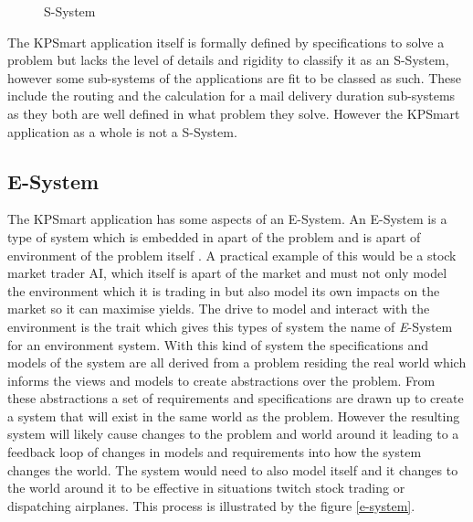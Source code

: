 \documentclass{style/CRPITStyle}
\renewcommand{\cite}{\citep}
\begin{document}
\vspace{.1in}

\begin{figure}[htb]
\caption{\protect\label{s-system} S-System}
\end{figure}

\vspace{.1in}

The KPSmart application itself is formally defined by specifications to solve a
problem but lacks the level of details and rigidity to classify it as an
S-System, however some sub-systems of the applications are fit to be classed as such.
These include the routing and the calculation for a mail delivery duration
sub-systems as they both are well defined in what problem they solve.
However the KPSmart application as a whole is not a S-System.

\subsection{E-System}

The KPSmart application has some aspects of an E-System.
An E-System is a type of system which is embedded in apart of the problem and is
apart of environment of the problem itself \cite{lehman:1980}. A practical example of this would be
a stock market trader AI, which itself is apart of the market and must not only
model the environment which it is trading in but also model its own impacts on the market
so it can maximise yields. The drive to model and interact with the environment
is the trait which gives this types of system the name of \emph{E}-System for
an environment system. With this kind of system the specifications and models
of the system are all derived from a problem residing the real world which
informs the views and models to create abstractions over the problem. From these
abstractions a set of requirements and specifications are drawn up to create a
system that will exist in the same world as the problem. However the resulting
system will likely cause changes to the problem and world around it leading to
a feedback loop of changes in models and requirements into how the system
changes the world. The system would need to also model itself and it changes to
the world around it to be effective in situations twitch stock trading or
dispatching airplanes. This process is illustrated by the figure \ref{e-system}.
\end{document}
